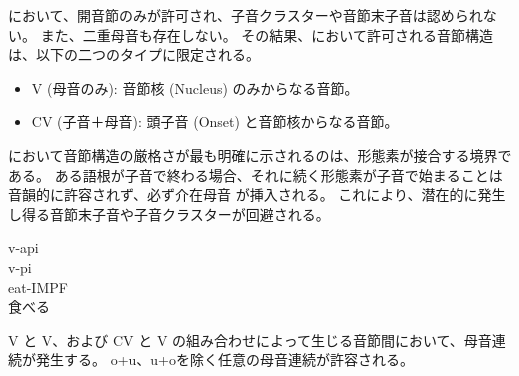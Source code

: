 \langname において、開音節のみが許可され、子音クラスターや音節末子音は認められない。
また、二重母音も存在しない。
その結果、\langname において許可される音節構造は、以下の二つのタイプに限定される。

\begin{itemize}
    \item {V (母音のみ)}: 音節核 (Nucleus) のみからなる音節。
    \item {CV (子音＋母音)}: 頭子音 (Onset) と音節核からなる音節。
\end{itemize}

\langname において音節構造の厳格さが最も明確に示されるのは、形態素が接合する境界である。
ある語根が子音で終わる場合、それに続く形態素が子音で始まることは音韻的に許容されず、必ず介在母音
が挿入される。
これにより、潜在的に発生し得る音節末子音や子音クラスターが回避される。

\begin{exe}
    \ex \glll v-api \\
    v-pi \\
    eat-IMPF \\
        \glt 食べる
\end{exe}

{V} と {V}、および {CV} と {V} の組み合わせによって生じる音節間において、母音連続が発生する。
o+u、u+oを除く任意の母音連続が許容される。

